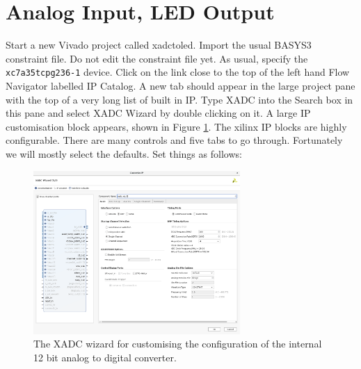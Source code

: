 \documentclass[../physical_computing.tex]{subfiles}
\begin{document}
\section{Analog Input, LED Output}
\label{sec:xadcinput}

Start a new Vivado project called xadctoled. Import the usual BASYS3 constraint file. Do not edit the constraint file yet. As usual, specify the \texttt{xc7a35tcpg236-1} device. Click on the link close to the top of the left hand Flow Navigator labelled IP Catalog. A new tab should appear in the large project pane with the top of a very long list of built in IP. Type XADC into the Search box in this pane and select XADC Wizard by double clicking on it. A large IP customisation block appears, shown in Figure \ref{fig:xadcwizard}. The xilinx IP blocks are highly configurable. There are many controls and five tabs to go through. Fortunately we will mostly select the defaults. Set things as follows:

\begin{figure}[htbp]
    \centering
    \includegraphics[width=0.7\textwidth]{figures/xadc_wizard.png}
    \caption{The XADC wizard for customising the configuration of the internal 12 bit analog to digital converter.}
    \label{fig:xadcwizard}
\end{figure}
\end{document}
